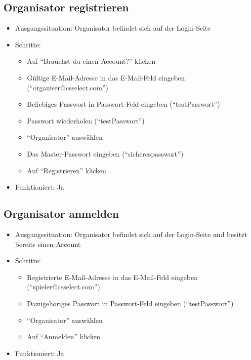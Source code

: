 \documentclass[a4paper]{scrreprt}
\begin{document}
            \subsection{Organisator registrieren}
            \begin{itemize}
                \item Ausgangssituation: Organisator befindet sich auf der Login-Seite
                \item Schritte:
                    \begin{itemize}
                        \item Auf \enquote{Brauchst du einen Account?} klicken
                        \item Gültige E-Mail-Adresse in das E-Mail-Feld eingeben (\enquote{organiser@csselect.com})
                        \item Beliebiges Passwort in Passwort-Feld eingeben (\enquote{testPasswort})
                        \item Passwort wiederholen (\enquote{testPasswort})
                        \item \enquote{Organisator} auswählen
                        \item Das Master-Passwort eingeben (\enquote{sicherespasswort})
                        \item Auf \enquote{Registrieren} klicken
                    \end{itemize}
            \item Funktioniert: Ja
            \end{itemize}

            \subsection{Organisator anmelden}
            \begin{itemize}
                \item Ausgangssituation: Organisator befindet sich auf der Login-Seite und besitzt bereits einen Account
                \item Schritte:
                    \begin{itemize}
                        \item Registrierte E-Mail-Adresse in das E-Mail-Feld eingeben (\enquote{spieler@csselect.com})
                        \item Dazugehöriges Passwort in Passwort-Feld eingeben (\enquote{testPasswort})
                        \item \enquote{Organisator} auswählen
                        \item Auf \enquote{Anmelden} klicken
                    \end{itemize}
                \item Funktioniert: Ja
            \end{itemize}
\end{document}

